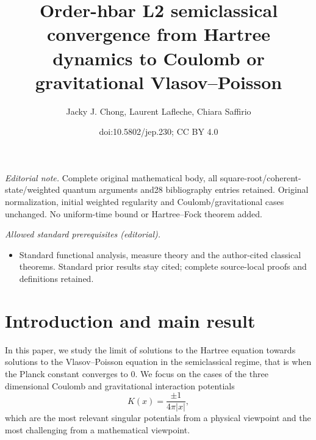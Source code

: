 \documentclass[10pt]{amsart}
\title{Order-hbar L2 semiclassical convergence from Hartree dynamics to Coulomb or gravitational Vlasov–Poisson}
\author{Jacky J. Chong, Laurent Lafleche, Chiara Saffirio}
\date{doi:10.5802/jep.230; CC BY 4.0}
\theoremstyle{definition}
\let\lt\left
\let\rt\right
\renewcommand {\(} {\lt(}
\renewcommand {\)} {\rt)}
\newcommand {\n}[1] {\lt\lvert #1 \rt\rvert}
\begin{document}
\maketitle
\noindent\textit{Editorial note.} Complete original mathematical body, all square-root/coherent-state/weighted quantum arguments and28 bibliography entries retained. Original normalization, initial weighted regularity and Coulomb/gravitational cases unchanged. No uniform-time bound or Hartree–Fock theorem added.\par\medskip
\noindent\textit{Allowed standard prerequisites (editorial).}\begin{itemize}
\item Standard functional analysis, measure theory and the author-cited classical theorems. Standard prior results stay cited; complete source-local proofs and definitions retained.
\end{itemize}\medskip
\vspace*{-1.5\baselineskip}
\tableofcontents


\vspace*{-4\baselineskip}\mbox{}
\section{Introduction and main result}

In this paper, we study the limit of solutions to the Hartree equation towards solutions to the Vlasov--Poisson equation in the semiclassical regime, that is when the Planck constant converges to $0$. We focus on the cases of the three dimensional Coulomb and gravitational interaction potentials
\begin{equation}\label{eq:K}
K(x) = \frac{\pm 1}{4\pi\n{x}},
\end{equation}
which are the most relevant singular potentials from a physical viewpoint and the most challenging from a mathematical viewpoint.
\end{document}
